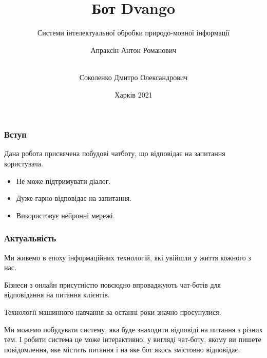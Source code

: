 \documentclass{beamer}
\title{Бот Dvango}
\subtitle{Системи інтелектуальної обробки природо-мовної інформації}
\author[Апраксін, Соколенко]{
    Апраксін Антон Романович
    \and\\
    Соколенко Дмитро Олександрович
}
\institute[ХНУРЕ]{ІТШІ-18-1}
\date{Харків 2021}
\begin{document}
\frame{\titlepage}

\begin{frame}
    \frametitle{Вступ}

    Дана робота присвячена побудові чатботу, що відповідає на запитання користувача.

    \begin{itemize}
        \item Не може підтримувати діалог.


        \item Дуже гарно відповідає на запитання.
        \item Використовує нейронні мережі.
    \end{itemize}
    
\end{frame}

\begin{frame}
    \frametitle{Актуальність}
    Ми живемо в епоху інформаційних технологій, які увійшли у життя кожного з нас. 

    Бізнеси з онлайн присутністю повсюдно впроваджують чат-ботів для відповідання на питання клієнтів.

    Технології машинного навчання за останні роки значно просунулися.


    Ми можемо побудувати систему, яка буде знаходити відповіді на питання з різних тем. І робити система це може інтерактивно, у вигляді чат-боту, якому ви пишете повідомлення, яке містить питання і на яке бот якось змістовно відповідає.

\end{frame}
\end{document}
